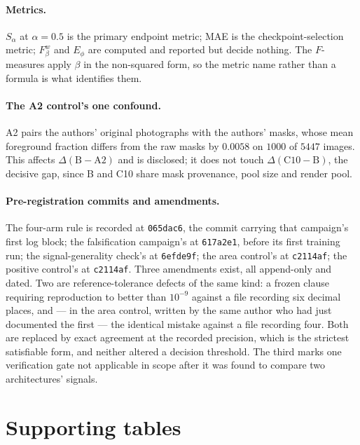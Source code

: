 \documentclass{article} %
\begin{document}
\paragraph{Metrics.} $S_\alpha$ at $\alpha = 0.5$ is the primary endpoint metric; MAE is the
checkpoint-selection metric; $F_\beta^w$ and $E_\phi$ are computed and reported but decide nothing.
The $F$-measures apply $\beta$ in the non-squared form, so the metric name rather than a formula is
what identifies them.

\paragraph{The A2 control's one confound.} A2 pairs the authors' original photographs with the
authors' masks, whose mean foreground fraction differs from the raw masks by $0.0058$ on $1000$ of
$5447$ images. This affects $\Delta(\mathrm{B}-\mathrm{A2})$ and is disclosed; it does not touch
$\Delta(\mathrm{C10}-\mathrm{B})$, the decisive gap, since B and C10 share mask provenance, pool size
and render pool.

\paragraph{Pre-registration commits and amendments.} The four-arm rule is recorded at
\texttt{065dac6}, the commit carrying that campaign's first log block; the falsification campaign's at
\texttt{617a2e1}, before its first training run; the signal-generality check's at \texttt{6efde9f};
the area control's at \texttt{c2114af}; the positive control's at \texttt{c2114af}. Three amendments
exist, all append-only and dated. Two are reference-tolerance defects of the same kind: a frozen clause
requiring reproduction to better than $10^{-9}$ against a file recording six decimal places, and --- in
the area control, written by the same author who had just documented the first --- the identical
mistake against a file recording four. Both are replaced by exact agreement at the recorded precision,
which is the strictest satisfiable form, and neither altered a decision threshold. The third marks one
verification gate not applicable in scope after it was found to compare two architectures' signals.

\section{Supporting tables}
\label{app:tables}


\end{document}
